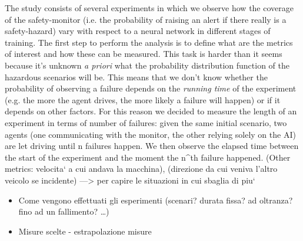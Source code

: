 The study consists of several experiments in which we observe how the coverage of the safety-monitor (i.e. the probability of raising an alert if there really is a safety-hazard) vary with respect to a neural network in different stages of training.\newline
The first step to perform the analysis is to define what are the metrics of interest and how these can be measured. This task is harder than it seems because it's unknown \textsl{a priori} what the probability distribution function of the hazardous scenarios will be. This means that we don't know whether the probability of observing a failure depends on the \textsl{running time} of the experiment (e.g. the more the agent drives, the more likely a failure will happen) or if it depends on other factors.\newline
For this reason we decided to measure the length of an experiment in terms of number of failures: given the same initial scenario, two agents (one communicating with the monitor, the other relying solely on the AI) are let driving until n failures happen. We then observe the elapsed time between the start of the experiment and the moment the n^{th} failure happened.\newline
(Other metrics: velocita` a cui andava la macchina), (direzione da cui veniva l'altro veicolo se incidente)
---> per capire le situazioni in cui sbaglia di piu`

	\begin{itemize}
		
		\item Come vengono effettuati gli esperimenti (scenari? durata fissa? ad oltranza? fino ad un fallimento? \dots)
		\item Misure scelte - estrapolazione misure
		
	\end{itemize}
